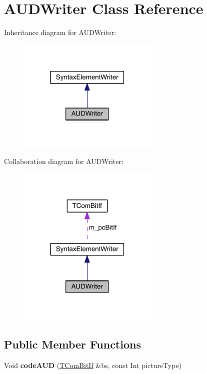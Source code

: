 \hypertarget{class_a_u_d_writer}{}\section{A\+U\+D\+Writer Class Reference}
\label{class_a_u_d_writer}


Inheritance diagram for A\+U\+D\+Writer\+:
\nopagebreak
\begin{figure}[H]
\begin{center}
\leavevmode
\includegraphics[width=190pt]{de/d58/class_a_u_d_writer__inherit__graph}
\end{center}
\end{figure}


Collaboration diagram for A\+U\+D\+Writer\+:
\nopagebreak
\begin{figure}[H]
\begin{center}
\leavevmode
\includegraphics[width=190pt]{d9/d2b/class_a_u_d_writer__coll__graph}
\end{center}
\end{figure}
\subsection*{Public Member Functions}
{\bf }\par
\begin{DoxyCompactItemize}
\item 
\mbox{\label{class_a_u_d_writer_af0106f77e5b7f2959b94880c8af9fca1}} 
Void {\bfseries code\+A\+UD} (\hyperlink{class_t_com_bit_if}{T\+Com\+Bit\+If} \&bs, const Int picture\+Type)
\end{DoxyCompactItemize}

